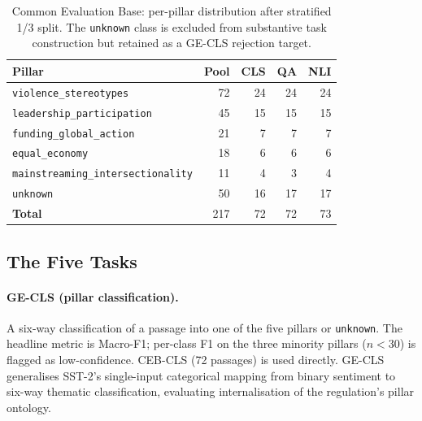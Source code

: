 \documentclass[pdflatex, sn-apa]{sn-jnl}%
\theoremstyle{thmstyleone}%
\theoremstyle{thmstyletwo}%
\theoremstyle{thmstylethree}%
\begin{document}
\begin{table}[h]
\centering
\caption{Common Evaluation Base: per-pillar distribution after stratified
1/3 split. The \texttt{unknown} class is excluded from substantive task
construction but retained as a GE-CLS rejection target.}
\label{tab:ceb}
\small
\begin{tabular}{@{}lrrrr@{}}
\toprule
Pillar                                & Pool & CLS & QA & NLI \\
\midrule
\texttt{violence\_stereotypes}        & 72   & 24  & 24 & 24  \\
\texttt{leadership\_participation}    & 45   & 15  & 15 & 15  \\
\texttt{funding\_global\_action}      & 21   &  7  &  7 &  7  \\
\texttt{equal\_economy}               & 18   &  6  &  6 &  6  \\
\texttt{mainstreaming\_intersectionality} & 11 & 4  &  3 &  4  \\
\texttt{unknown}                      & 50   & 16  & 17 & 17  \\
\midrule
\textbf{Total}                        & 217  & 72  & 72 & 73  \\
\bottomrule
\end{tabular}
\end{table}

\subsection{The Five Tasks}
\label{sec:bench:tasks}

\paragraph{GE-CLS (pillar classification).}
A six-way classification of a passage into one of the five pillars or
\texttt{unknown}. The headline metric is Macro-F1; per-class F1 on the
three minority pillars ($n<30$) is flagged as low-confidence. CEB-CLS
(72 passages) is used directly. GE-CLS generalises SST-2's single-input
categorical mapping from binary sentiment to six-way thematic
classification, evaluating internalisation of the regulation's pillar
ontology.
\end{document}
